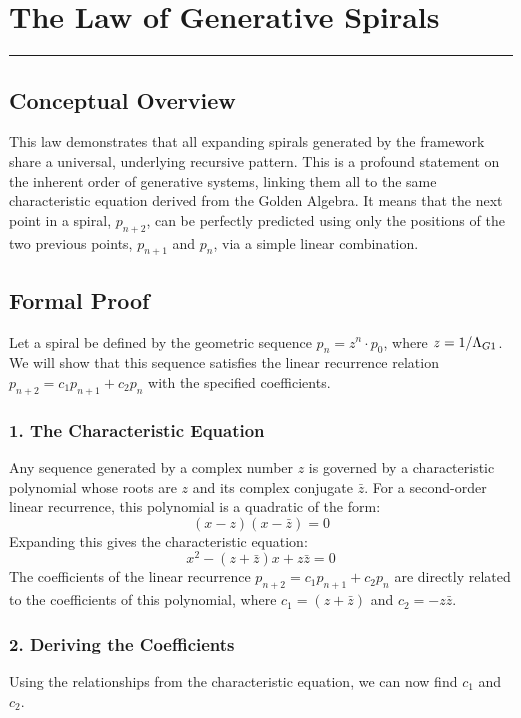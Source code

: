 \section{The Law of Generative Spirals}
\label{sec:law_of_generative_spirals}
\hrule
\vspace{1em}


\subsection{Conceptual Overview}
This law demonstrates that all expanding spirals generated by the framework share a universal, underlying recursive pattern. This is a profound statement on the inherent order of generative systems, linking them all to the same characteristic equation derived from the Golden Algebra. It means that the next point in a spiral, $p_{n+2}$, can be perfectly predicted using only the positions of the two previous points, $p_{n+1}$ and $p_n$, via a simple linear combination.

\subsection{Formal Proof}
Let a spiral be defined by the geometric sequence $p_n = z^n \cdot p_0$, where $z = 1/\Lambda_{G1}$. We will show that this sequence satisfies the linear recurrence relation $p_{n+2} = c_1 p_{n+1} + c_2 p_n$ with the specified coefficients.

\subsubsection{1. The Characteristic Equation}
Any sequence generated by a complex number $z$ is governed by a characteristic polynomial whose roots are $z$ and its complex conjugate $\bar{z}$. For a second-order linear recurrence, this polynomial is a quadratic of the form:
$$ (x - z)(x - \bar{z}) = 0 $$
Expanding this gives the characteristic equation:
$$ x^2 - (z + \bar{z})x + z\bar{z} = 0 $$
The coefficients of the linear recurrence $p_{n+2} = c_1 p_{n+1} + c_2 p_n$ are directly related to the coefficients of this polynomial, where $c_1 = (z+\bar{z})$ and $c_2 = -z\bar{z}$.

\subsubsection{2. Deriving the Coefficients}
Using the relationships from the characteristic equation, we can now find $c_1$ and $c_2$.

